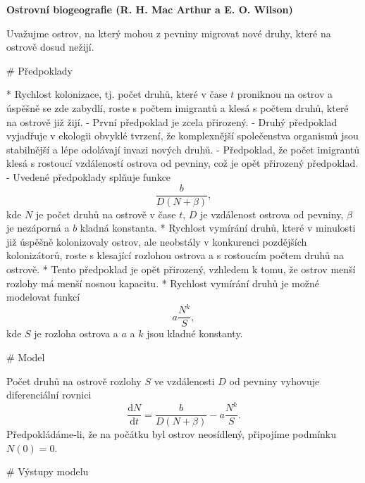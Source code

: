 \documentclass{article}
\begin{document}
\begin{center}
  \Large \bfseries
Ostrovní biogeografie (R. H. Mac Arthur a E. O. Wilson)
\end{center}
\pagestyle{empty}



\begin{markdown}
 
Uvažujme ostrov, na který mohou z pevniny migrovat nové druhy, které na ostrově dosud nežijí.

# Předpoklady

* Rychlost kolonizace, tj. počet druhů, které v čase
$t$ proniknou na ostrov a úspěšně se zde zabydlí, roste s počtem
imigrantů a klesá s počtem druhů, které na ostrově  již žijí.
    - První
  předpoklad je zcela přirozený.
    - Druhý předpoklad vyjadřuje v ekologii obvyklé
tvrzení, že komplexnější společenstva organismů jsou stabilnější a lépe
odolávají invazi nových druhů.
    - Předpoklad, že počet imigrantů klesá s rostoucí
vzdáleností ostrova od pevniny, což je opět přirozený  předpoklad.
    - Uvedené předpoklady splňuje funkce
$$
 \frac b{D(N+\beta)},
$$
kde $N$ je počet druhů na ostrově v čase $t$, $D$ je vzdálenost ostrova od
pevniny, $\beta$ je nezáporná a  $b$ kladná konstanta. 
* Rychlost vymírání  druhů, které v minulosti již úspěšně
kolonizovaly ostrov, ale neobstály v konkurenci pozdějších kolonizátorů,
roste s klesající rozlohou ostrova a s rostoucím počtem druhů na
ostrově.
    * Tento předpoklad
je opět přirozený, vzhledem k tomu, že ostrov menší rozlohy má menší nosnou
kapacitu.
    * Rychlost vymírání druhů je možné modelovat funkcí
$$
 a\frac {N^k}S,
$$
kde $S$ je rozloha ostrova a $a$ a $k$ jsou kladné konstanty.

# Model

Počet druhů na ostrově rozlohy $S$ ve
vzdálenosti $D$ od pevniny vyhovuje diferenciální rovnici
$$
  \frac{\mathrm dN}{\mathrm dt}= \frac b{D(N+\beta)}-a\frac {N^k}S.
$$
Předpokládáme-li, že na počátku byl ostrov neosídlený, připojíme
podmínku $N(0)=0$.

# Výstupy modelu

\end{markdown}
\end{document}
